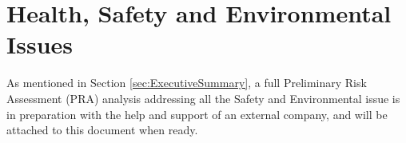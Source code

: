\section{Health, Safety and Environmental Issues}
\label{sec:HealthSafetyEnvironmentalIssues}


As mentioned in Section \ref{sec:ExecutiveSummary}, a full Preliminary Risk Assessment (PRA) analysis addressing all the Safety and Environmental issue is in preparation with the help and support of an external company, and will be attached to this document  when ready.